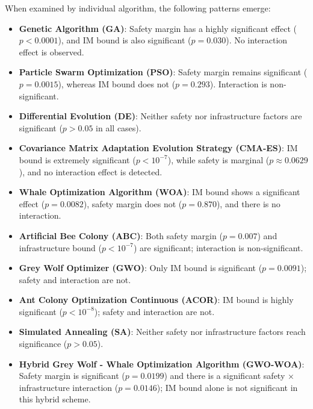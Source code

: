 \documentclass[Afour,sagev,times]{sagej}
\begin{document}
When examined by individual algorithm, the following patterns emerge:
\begin{itemize}
    \item \textbf{Genetic Algorithm (GA)}: Safety margin has a highly significant effect (\(p<0.0001\)), and \gls{IM} bound is also significant (\(p=0.030\)). No interaction effect is observed.
    \item \textbf{Particle Swarm Optimization (PSO)}: Safety margin remains significant (\(p=0.0015\)), whereas \gls{IM} bound does not (\(p=0.293\)). Interaction is non-significant.
    \item \textbf{Differential Evolution (DE)}: Neither safety nor infrastructure factors are significant (\(p>0.05\) in all cases).
    \item \textbf{Covariance Matrix Adaptation Evolution Strategy (CMA-ES)}: \gls{IM} bound is extremely significant (\(p<10^{-7}\)), while safety is marginal (\(p\approx0.0629\)), and no interaction effect is detected.
    \item \textbf{Whale Optimization Algorithm (WOA)}: \gls{IM} bound shows a significant effect (\(p=0.0082\)), safety margin does not (\(p=0.870\)), and there is no interaction.
    \item \textbf{Artificial Bee Colony (ABC)}: Both safety margin (\(p=0.007\)) and infrastructure bound (\(p<10^{-7}\)) are significant; interaction is non-significant.
    \item \textbf{Grey Wolf Optimizer (GWO)}: Only \gls{IM} bound is significant (\(p=0.0091\)); safety and interaction are not.
    \item \textbf{Ant Colony Optimization Continuous (ACOR)}: \gls{IM} bound is highly significant (\(p<10^{-8}\)); safety and interaction are not.
    \item \textbf{Simulated Annealing (SA)}: Neither safety nor infrastructure factors reach significance (\(p>0.05\)).
    \item \textbf{Hybrid Grey Wolf - Whale Optimization Algorithm (GWO-WOA)}: Safety margin is significant (\(p=0.0199\)) and there is a significant safety × infrastructure interaction (\(p=0.0146\)); \gls{IM} bound alone is not significant in this hybrid scheme.
\end{itemize}
\end{document}
